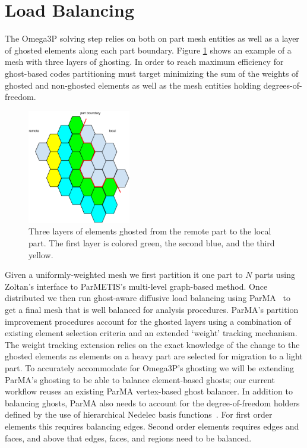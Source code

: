 \documentclass[a4paper]{article}
\begin{document}
\section{Load Balancing}\label{sec:lb}

The Omega3P solving step relies on both on part mesh entities as well as a layer of 
ghosted elements along each part boundary. Figure \ref{fig:ghost3} shows an 
example of a mesh with three layers of ghosting. In order to reach maximum efficiency
for ghost-based codes partitioning must target minimizing the sum of the 
weights of ghosted and non-ghosted elements as well as the mesh entities holding
degrees-of-freedom.

\begin{figure}[ht]
\centering
\includegraphics[width=0.4\textwidth]{ghostingExample.eps} 
\caption{\label{fig:ghost3} Three layers of elements ghosted from the remote part to the local part.  The first layer is colored green, the second blue, and the third yellow.}
\end{figure}

Given a
uniformly-weighted mesh we first partition it one part to $N$ parts using
Zoltan's interface to ParMETIS's multi-level graph-based method.
Once distributed we then run ghost-aware diffusive load balancing using
ParMA~\cite{SmithParma2015} to get a final mesh that is well balanced for
analysis procedures.
ParMA's partition improvement procedures account for
the ghosted layers using a combination of existing element selection criteria
and an extended `weight' tracking mechanism.
The weight tracking extension relies on the exact knowledge of the change to the
ghosted elements as elements on a heavy part are selected for migration to a
light part.
To accurately accommodate for Omega3P's ghosting we will be extending ParMA's
ghosting to be able to balance element-based ghosts; our current
workflow reuses an existing ParMA vertex-based ghost balancer.
In addition to balancing ghosts, ParMA also needs to account for the
degree-of-freedom holders defined by the use of hierarchical Nedelec basis
functions~\cite{ingelstrom2006new}.
For first order elements this requires balancing edges.
Second order elements requires edges and faces, and above that edges, faces, and
regions need to be balanced.
\end{document}
